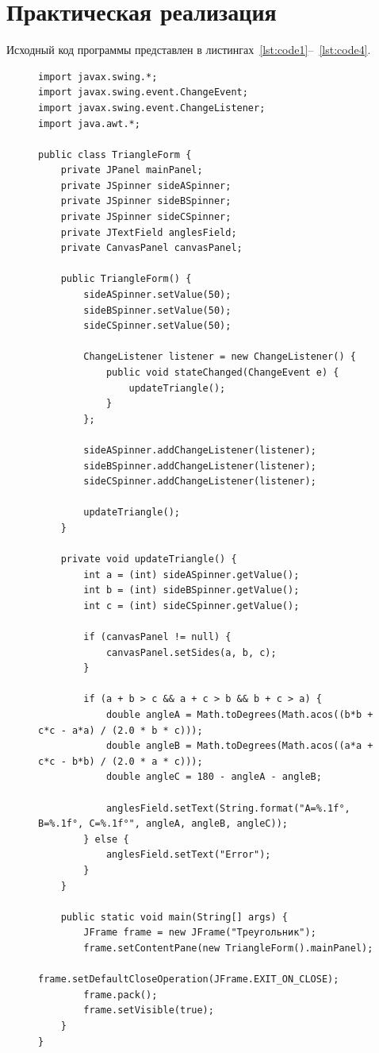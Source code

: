 \documentclass[a4paper, 14pt]{extarticle}
\begin{document}
\section {Практическая реализация}
Исходный код программы представлен в листингах~\ref{lst:code1}--~\ref{lst:code4}.
\begin{figure}[!htb]
\begin{lstlisting}[language={},caption={Main file variant 2},label={lst:code1}]
import javax.swing.*;
import javax.swing.event.ChangeEvent;
import javax.swing.event.ChangeListener;
import java.awt.*;

public class TriangleForm {
    private JPanel mainPanel;
    private JSpinner sideASpinner;
    private JSpinner sideBSpinner;
    private JSpinner sideCSpinner;
    private JTextField anglesField;
    private CanvasPanel canvasPanel;

    public TriangleForm() {
        sideASpinner.setValue(50);
        sideBSpinner.setValue(50);
        sideCSpinner.setValue(50);

        ChangeListener listener = new ChangeListener() {
            public void stateChanged(ChangeEvent e) {
                updateTriangle();
            }
        };

        sideASpinner.addChangeListener(listener);
        sideBSpinner.addChangeListener(listener);
        sideCSpinner.addChangeListener(listener);

        updateTriangle();
    }

    private void updateTriangle() {
        int a = (int) sideASpinner.getValue();
        int b = (int) sideBSpinner.getValue();
        int c = (int) sideCSpinner.getValue();

        if (canvasPanel != null) {
            canvasPanel.setSides(a, b, c);
        }

        if (a + b > c && a + c > b && b + c > a) {
            double angleA = Math.toDegrees(Math.acos((b*b + c*c - a*a) / (2.0 * b * c)));
            double angleB = Math.toDegrees(Math.acos((a*a + c*c - b*b) / (2.0 * a * c)));
            double angleC = 180 - angleA - angleB;

            anglesField.setText(String.format("A=%.1f°, B=%.1f°, C=%.1f°", angleA, angleB, angleC));
        } else {
            anglesField.setText("Error");
        }
    }

    public static void main(String[] args) {
        JFrame frame = new JFrame("Треугольник");
        frame.setContentPane(new TriangleForm().mainPanel);
        frame.setDefaultCloseOperation(JFrame.EXIT_ON_CLOSE);
        frame.pack();
        frame.setVisible(true);
    }
}


\end{lstlisting}
\end{figure}
\end{document}
